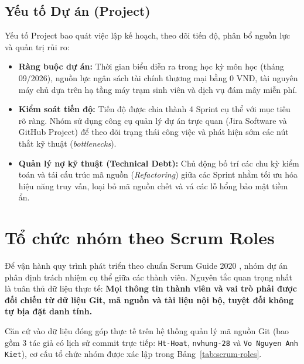 \subsection{Yếu tố Dự án (Project)}
Yếu tố Project bao quát việc lập kế hoạch, theo dõi tiến độ, phân bổ nguồn lực và quản trị rủi ro:
\begin{itemize}
    \item \textbf{Ràng buộc dự án:} Thời gian biểu diễn ra trong học kỳ môn học (tháng 09/2026), nguồn lực ngân sách tài chính thương mại bằng 0 VNĐ, tài nguyên máy chủ dựa trên hạ tầng máy trạm sinh viên và dịch vụ đám mây miễn phí.
    \item \textbf{Kiểm soát tiến độ:} Tiến độ được chia thành 4 Sprint cụ thể với mục tiêu rõ ràng. Nhóm sử dụng công cụ quản lý dự án trực quan (Jira Software và GitHub Project) để theo dõi trạng thái công việc và phát hiện sớm các nút thắt kỹ thuật (\textit{bottlenecks}).
    \item \textbf{Quản lý nợ kỹ thuật (Technical Debt):} Chủ động bố trí các chu kỳ kiểm toán và tái cấu trúc mã nguồn (\textit{Refactoring}) giữa các Sprint nhằm tối ưu hóa hiệu năng truy vấn, loại bỏ mã nguồn chết và vá các lỗ hổng bảo mật tiềm ẩn.
\end{itemize}

\section{Tổ chức nhóm theo Scrum Roles}
\label{sec:scrum-roles}

Để vận hành quy trình phát triển theo chuẩn Scrum Guide 2020 \cite{scrumguide2020}, nhóm dự án phân định trách nhiệm cụ thể giữa các thành viên. Nguyên tắc quan trọng nhất là tuân thủ dữ liệu thực tế: \textbf{Mọi thông tin thành viên và vai trò phải được đối chiếu từ dữ liệu Git, mã nguồn và tài liệu nội bộ, tuyệt đối không tự bịa đặt danh tính.}

Căn cứ vào dữ liệu đóng góp thực tế trên hệ thống quản lý mã nguồn Git (bao gồm 3 tác giả có lịch sử commit trực tiếp: \texttt{Ht-Hoat}, \texttt{nvhung-28} và \texttt{Vo Nguyen Anh Kiet}), cơ cấu tổ chức nhóm được xác lập trong Bảng~\ref{tab:scrum-roles}.

